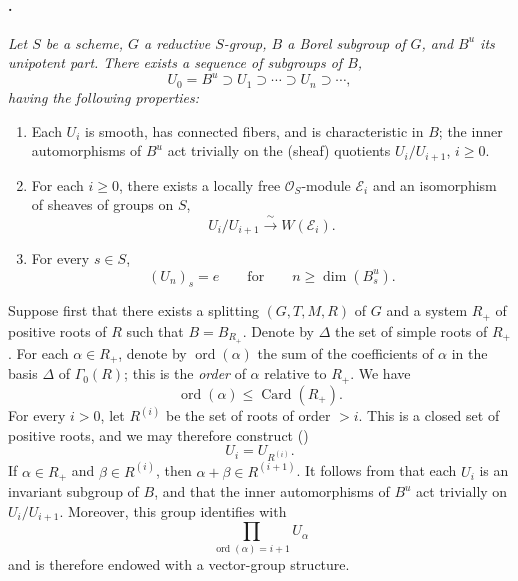 \paragraph{.}
{\itshape Let \(S\) be a scheme, \(G\) a reductive \(S\)-group,
\(B\) a Borel subgroup of \(G\), and \(B^u\) its unipotent part.
There exists a sequence of subgroups of \(B\),
\[
  U_0=B^u\supset U_1\supset\cdots\supset U_n\supset\cdots,
\]
having the following properties:
\begin{enumerate}
\item[\textup{(i)}] Each \(U_i\) is smooth, has connected fibers,
and is characteristic in \(B\); the inner automorphisms of \(B^u\)
act trivially on the \textup{(sheaf)} quotients \(U_i/U_{i+1}\),
\(i\geq 0\).

\item[\textup{(ii)}] For each \(i\geq 0\), there exists a locally
free \(\mathcal O_S\)-module \(\mathcal E_i\) and an isomorphism of
sheaves of groups on \(S\),
\[
  U_i/U_{i+1}\xrightarrow{\;\sim\;}W(\mathcal E_i).
\]

\item[\textup{\SGAInlineRefTarget{sga3:xxii:prop:5.9.5:item:iii}(iii)}] For every \(s\in S\),
\[
  (U_n)_s=e
  \qquad\text{for}\qquad
  n\geq\dim(B^u_s).
\]
\end{enumerate}}

Suppose first that there exists a splitting \((G,T,M,R)\) of \(G\)
and a system \(R_+\) of positive roots of \(R\) such that
\(B=B_{R_+}\). Denote by \(\Delta\) the set of simple roots of
\(R_+\). For each \(\alpha\in R_+\), denote by
\(\operatorname{ord}(\alpha)\) the sum of the coefficients of
\(\alpha\) in the basis \(\Delta\) of \(\Gamma_0(R)\); this is the
\emph{order} of \(\alpha\) relative to \(R_+\). We have
\[
  \operatorname{ord}(\alpha)\leq\operatorname{Card}(R_+).
\]
For every \(i>0\), let \(R^{(i)}\) be the set of roots of order
\(>i\). This is a closed set of positive roots, and we may therefore
construct \textup{()}
\[
  U_i=U_{R^{(i)}}.
\]
If \(\alpha\in R_+\) and \(\beta\in R^{(i)}\), then
\(\alpha+\beta\in R^{(i+1)}\). It follows from  that each
\(U_i\) is an invariant subgroup of \(B\), and that the inner
automorphisms of \(B^u\) act trivially on \(U_i/U_{i+1}\). Moreover,
this group identifies with
\[
  \prod_{\operatorname{ord}(\alpha)=i+1}U_\alpha
\]
and is therefore endowed with a vector-group structure.

